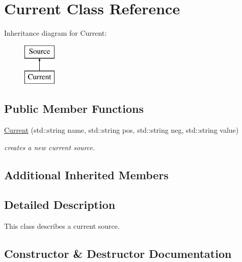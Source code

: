 \hypertarget{class_s_p_i_c_e_1_1_current}{}\section{Current Class Reference}
\label{class_s_p_i_c_e_1_1_current}
Inheritance diagram for Current\+:\begin{figure}[H]
\begin{center}
\leavevmode
\includegraphics[height=2.000000cm]{class_s_p_i_c_e_1_1_current}
\end{center}
\end{figure}
\subsection*{Public Member Functions}
\begin{DoxyCompactItemize}
\item 
\mbox{\hyperlink{class_s_p_i_c_e_1_1_current_a798deca3f9017adbf1bb2ab5ca2f2f5e}{Current}} (std\+::string name, std\+::string pos, std\+::string neg, std\+::string value)
\begin{DoxyCompactList}\small\item\em creates a new current source. \end{DoxyCompactList}\end{DoxyCompactItemize}
\subsection*{Additional Inherited Members}


\subsection{Detailed Description}
This class describes a current source. 

\subsection{Constructor \& Destructor Documentation}
\mbox{\label{class_s_p_i_c_e_1_1_current_a798deca3f9017adbf1bb2ab5ca2f2f5e}} 
